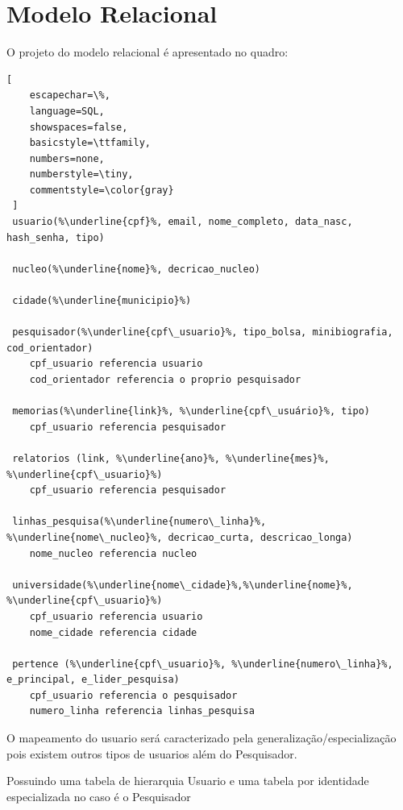 \documentclass[11pt]{../../classes/ifscarticle}
\begin{document}
\section{Modelo Relacional}
O projeto do modelo relacional é apresentado no quadro:
\begin{lstlisting}[
    escapechar=\%,
    language=SQL,
    showspaces=false,
    basicstyle=\ttfamily,
    numbers=none,
    numberstyle=\tiny,
    commentstyle=\color{gray}
 ]
 usuario(%\underline{cpf}%, email, nome_completo, data_nasc, hash_senha, tipo)

 nucleo(%\underline{nome}%, decricao_nucleo)
 
 cidade(%\underline{municipio}%)

 pesquisador(%\underline{cpf\_usuario}%, tipo_bolsa, minibiografia, cod_orientador)
    cpf_usuario referencia usuario
    cod_orientador referencia o proprio pesquisador

 memorias(%\underline{link}%, %\underline{cpf\_usuário}%, tipo)
    cpf_usuario referencia pesquisador

 relatorios (link, %\underline{ano}%, %\underline{mes}%, %\underline{cpf\_usuario}%)
    cpf_usuario referencia pesquisador

 linhas_pesquisa(%\underline{numero\_linha}%, %\underline{nome\_nucleo}%, decricao_curta, descricao_longa)
    nome_nucleo referencia nucleo

 universidade(%\underline{nome\_cidade}%,%\underline{nome}%, %\underline{cpf\_usuario}%)
    cpf_usuario referencia usuario
    nome_cidade referencia cidade

 pertence (%\underline{cpf\_usuario}%, %\underline{numero\_linha}%, e_principal, e_lider_pesquisa)
    cpf_usuario referencia o pesquisador
    numero_linha referencia linhas_pesquisa
\end{lstlisting}

O mapeamento do usuario será caracterizado pela  
generalização/especialização pois existem 
outros tipos de usuarios além do Pesquisador.

Possuindo uma tabela de hierarquia Usuario e
uma tabela por identidade especializada no caso 
é o Pesquisador
\end{document}
